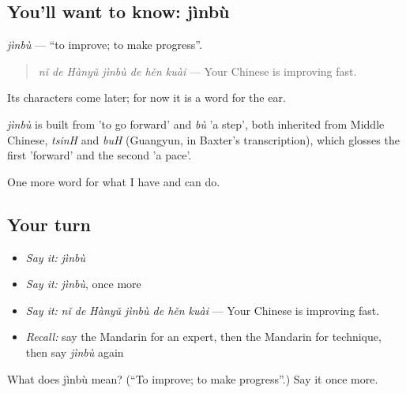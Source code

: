 \subsection*{You'll want to know: jìnbù}
\emph{jìnbù} — \textquotedblleft{}to improve; to make progress\textquotedblright{}.

\begin{quote}
\emph{nǐ de Hànyǔ jìnbù de hěn kuài} — Your Chinese is improving fast.
\end{quote}

Its characters come later; for now it is a word for the ear.

\begin{cousinweb}
\emph{jìnbù} is built from  'to go forward' and \emph{bù} 'a step', both inherited from Middle Chinese, \emph{tsinH} and \emph{buH} (Guangyun, in Baxter's transcription), which glosses the first 'forward' and the second 'a pace'.
\end{cousinweb}

\begin{grammarlens}[title={What you've built}]
One more word for what I have and can do.
\end{grammarlens}

\subsection*{Your turn}
\begin{itemize}
\raggedright
  \item \emph{Say it:} \emph{jìnbù}
  \item \emph{Say it:} \emph{jìnbù}, once more
  \item \emph{Say it:} \emph{nǐ de Hànyǔ jìnbù de hěn kuài} — Your Chinese is improving fast.
  \item \emph{Recall:} say the Mandarin for an expert, then the Mandarin for technique, then say \emph{jìnbù} again
\end{itemize}

\begin{tcolorbox}[breakable,colback=teal!4,colframe=teal!35!black,title={Before you move on}]
What does jìnbù mean? (\textquotedblleft{}To improve; to make progress\textquotedblright{}.) Say it once more.
\end{tcolorbox}
